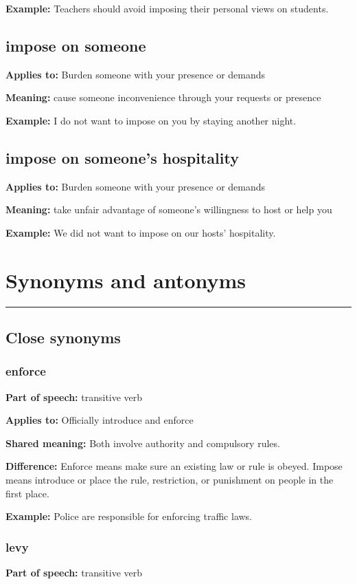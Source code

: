 \documentclass[11pt]{article}
\newcommand{\sectionrule}{\par\vspace{-0.5em}\noindent\textcolor{Accent}{\rule{\linewidth}{0.6pt}}\par}
\begin{document}
\textbf{Example:} Teachers should avoid imposing their personal views on students.

\subsection{impose on someone}
\textbf{Applies to:} Burden someone with your presence or demands

\textbf{Meaning:} cause someone inconvenience through your requests or presence

\textbf{Example:} I do not want to impose on you by staying another night.

\subsection{impose on someone's hospitality}
\textbf{Applies to:} Burden someone with your presence or demands

\textbf{Meaning:} take unfair advantage of someone's willingness to host or help you

\textbf{Example:} We did not want to impose on our hosts' hospitality.

\section{Synonyms and antonyms}
\sectionrule
\subsection{Close synonyms}
\subsubsection{enforce}
\textbf{Part of speech:} transitive verb

\textbf{Applies to:} Officially introduce and enforce

\textbf{Shared meaning:} Both involve authority and compulsory rules.

\textbf{Difference:} Enforce means make sure an existing law or rule is obeyed. Impose means introduce or place the rule, restriction, or punishment on people in the first place.

\textbf{Example:} Police are responsible for enforcing traffic laws.

\subsubsection{levy}
\textbf{Part of speech:} transitive verb
\end{document}

